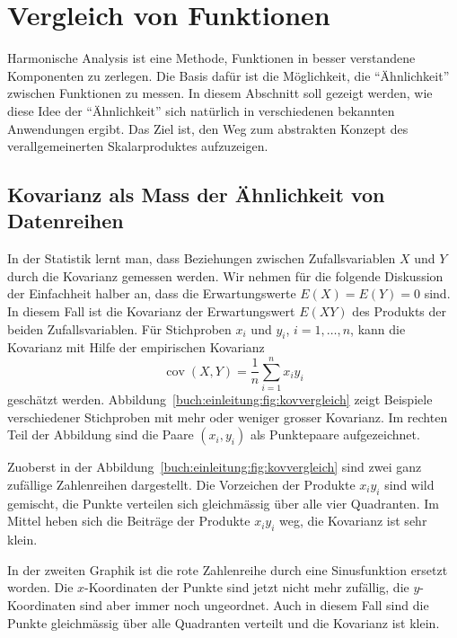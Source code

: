 %
%
%
\section{Vergleich von Funktionen
\label{buch:einleitung:section:vergleich}}
Harmonische Analysis ist eine Methode, Funktionen in besser
verstandene Komponenten zu zerlegen.
Die Basis dafür ist die Möglichkeit, die ``Ähnlichkeit'' zwischen
Funktionen zu messen.
In diesem Abschnitt soll gezeigt werden, wie diese Idee der
``Ähnlichkeit'' sich natürlich in verschiedenen bekannten
Anwendungen ergibt.
Das Ziel ist, den Weg zum abstrakten Konzept des verallgemeinerten
Skalarproduktes aufzuzeigen.
%

%
%
\subsection{Kovarianz als Mass der Ähnlichkeit von Datenreihen}
In der Statistik lernt man, dass Beziehungen zwischen Zufallsvariablen
%
$X$ und $Y$ durch die Kovarianz gemessen werden.
%
Wir nehmen für die folgende Diskussion der Einfachheit halber an,
dass die Erwartungswerte $E(X)=E(Y)=0$ sind.
%
In diesem Fall ist die Kovarianz der Erwartungswert $E(XY)$ des
Produkts der beiden Zufallsvariablen.
Für Stichproben $x_i$ und $y_i$, $i=1,\dots,n$, kann die Kovarianz mit
Hilfe der empirischen Kovarianz
\[
\operatorname{cov}(X,Y)
=
\frac{1}{n}
\sum_{i=1}^n x_iy_i
\]
geschätzt werden.
Abbildung~\ref{buch:einleitung:fig:kovvergleich} zeigt Beispiele
verschiedener Stichproben mit mehr oder weniger grosser
Kovarianz.
Im rechten Teil der Abbildung sind die Paare $(x_i,y_i)$ als
Punktepaare aufgezeichnet.



Zuoberst in der Abbildung~\ref{buch:einleitung:fig:kovvergleich}
sind zwei ganz zufällige Zahlenreihen dargestellt.
Die Vorzeichen der Produkte $x_iy_i$ sind wild gemischt, die Punkte
verteilen sich gleichmässig über alle vier Quadranten.
Im Mittel heben sich die Beiträge der Produkte $x_iy_i$ weg, die
Kovarianz ist sehr klein.

In der zweiten Graphik ist die rote Zahlenreihe durch eine Sinusfunktion
ersetzt worden.
%
Die $x$-Koordinaten der Punkte sind jetzt nicht mehr zufällig, die
$y$-Koordinaten sind aber immer noch ungeordnet. 
Auch in diesem Fall sind die Punkte gleichmässig über alle Quadranten
verteilt und die Kovarianz ist klein.

